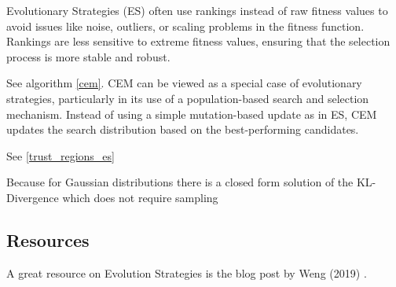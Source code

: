 \begin{enumerate}
\newline
Evolutionary Strategies (ES) often use rankings instead of raw fitness values to avoid issues like noise, 
outliers, or scaling problems in the fitness function. Rankings are less sensitive to extreme fitness values, 
ensuring that the selection process is more stable and robust.

\newline
See algorithm \ref{cem}. CEM can be viewed as a special case of evolutionary strategies, particularly in its 
use of a population-based search and selection mechanism. Instead of using a simple mutation-based update as 
in ES, CEM updates the search distribution based on the best-performing candidates. 

\newline
See \ref{trust_regions_es}

\newline
Because for Gaussian distributions there is a closed form solution of the KL-Divergence which does not require sampling
\end{enumerate}

\subsection{Resources}
A great resource on Evolution Strategies is the blog post by Weng (2019) \cite{weng2019ES}.